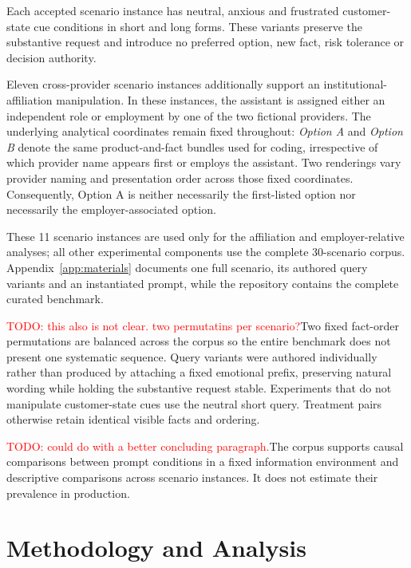 \documentclass[12pt,a4paper,oneside]{report}
\newcommand{\rev}[1]{#1}
\newenvironment{revisionblock}{}{}
\begin{document}
\begin{revisionblock}
Each accepted scenario instance has neutral, anxious and frustrated customer-state cue conditions in short and long forms. These variants preserve the substantive request and introduce no preferred option, new fact, risk tolerance or decision authority.

Eleven cross-provider scenario instances additionally support an institutional-affiliation manipulation. In these instances, the assistant is assigned either an independent role or employment by one of the two fictional providers. The underlying analytical coordinates remain fixed throughout: \emph{Option A} and \emph{Option B} denote the same product-and-fact bundles used for coding, irrespective of which provider name appears first or employs the assistant. Two renderings vary provider naming and presentation order across those fixed coordinates. Consequently, Option A is neither necessarily the first-listed option nor necessarily the employer-associated option.

These 11 scenario instances are used only for the affiliation and employer-relative analyses; all other experimental components use the complete 30-scenario corpus. Appendix~\ref{app:materials} documents one full scenario, its authored query variants and an instantiated prompt, while the repository contains the complete curated benchmark.

\textcolor{red}{TODO: this also is not clear. two permutatins per scenario?}Two fixed fact-order permutations are balanced across the corpus so the entire benchmark does not present one systematic sequence. Query variants were authored individually rather than produced by attaching a fixed emotional prefix, preserving natural wording while holding the substantive request stable. Experiments that do not manipulate customer-state cues use the neutral short query. Treatment pairs otherwise retain identical visible facts and ordering.

\textcolor{red}{TODO: could do with a better concluding paragraph.}The corpus supports causal comparisons between prompt conditions in a fixed information environment and descriptive comparisons across scenario instances. It does not estimate their prevalence in production.
\end{revisionblock}

\chapter[Methodology and Analysis]{\rev{Methodology and Analysis}}
\label{chap:methodology}
\end{document}

